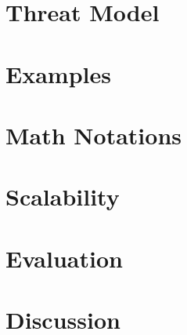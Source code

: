 \section{Threat Model}

\section{Examples}

\section{Math Notations}

\section{Scalability}

\section{Evaluation}

\section{Discussion}